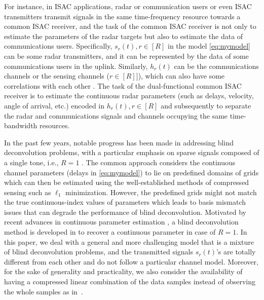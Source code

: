 \documentclass[conference,10pt]{IEEEtran}
\theoremstyle{remark}
\theoremstyle{plain}
\theoremstyle{definition}
\theoremstyle{remark}
\begin{document}
For instance, in ISAC applications, radar or communication users or even ISAC transmitters transmit signals in the same time-frequency resource towards a common ISAC receiver, and the task of the common ISAC receiver is not only to estimate the parameters of the radar targets but also to estimate the data of communications users. Specifically,
$s_r(t), r\in [R]$ in the model \eqref{eq:mymodel} can be some radar transmitters, and it can be represented by the data of some communications users in the uplink. Similarly, $h_r(t)$ can be the communications channels or the sensing channels ($r\in[R]]$), which can also have some correlations with each other \cite{liu2020joint}. The task of the dual-functional common ISAC receiver is to estimate the continuous radar parameters (such as delays, velocity, angle of arrival, etc.) encoded in $h_r(t), r\in [R]$  and subsequently to separate the radar and communications signals and channels occupying the same time-bandwidth resources.

  In the past few years, notable progress has been made in addressing blind deconvolution problems, with a particular emphasis on sparse signals composed of a single tone, i.e., $R=1$  \cite{jain2017non,ahmed2013blind,ling2015self,candes2013phaselift}. The common approach considers the continuous channel parameters (delays in \eqref{eq:mymodel}) to lie on predefined domains of grids which can then be estimated using the well-established methods of compressed sensing such as $\ell_1$ minimization. However, the predefined grids might not match the true continuous-index values of parameters which leads to basis mismatch issues that can degrade the performance of blind deconvolution.   
 Motivated by recent advances in continuous parameter estimation \cite{candes2014towards}, a blind deconvolution method is developed in \cite{chi2016guaranteed} to recover a continuous parameter in case of $R=1$. In this paper, we deal with a general and more challenging model that is a mixture of blind deconvolution problems, and the transmitted signals $s_r(t)$'s are totally different from each other and do not follow a particular channel model. Moreover, for the sake of generality and practicality, we also consider the availability of having a compressed linear combination of the data samples instead of observing the whole samples as in~\cite{Jacome2020DualBlind}. 
 
\end{document}
